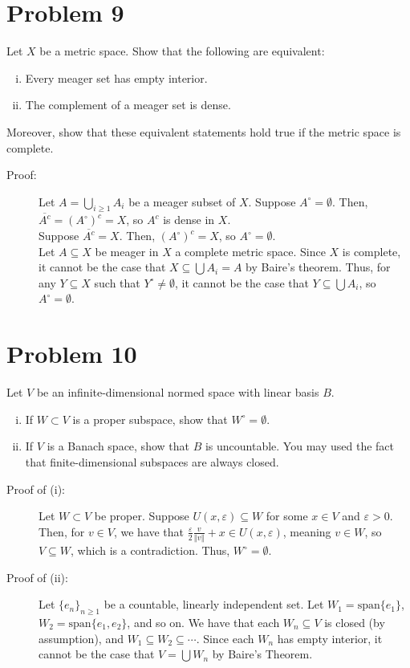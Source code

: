 \documentclass[10pt]{extarticle}
\newcommand{\norm}[1]{\left\Vert #1\right\Vert}
\begin{document}
  \section{Problem 9}%
  Let $X$ be a metric space. Show that the following are equivalent:
  \begin{enumerate}[(i)]
    \item Every meager set has empty interior.
    \item The complement of a meager set is dense.
  \end{enumerate}
  Moreover, show that these equivalent statements hold true if the metric space is complete.
  \begin{description}
    \item[Proof:] Let $A = \bigcup_{i\geq 1}A_i$ be a meager subset of $X$. Suppose $A^{\circ} = \emptyset$. Then, $\overline{A^{c}} = \left(A^{\circ}\right)^{c} = X$, so $A^{c}$ is dense in $X$.\\

      Suppose $\overline{A^{c}} = X$. Then, $\left(A^{\circ}\right)^{c} = X$, so $A^{\circ} = \emptyset$.\\

      Let $A\subseteq X$ be meager in $X$ a complete metric space. Since $X$ is complete, it cannot be the case that $X\subseteq \bigcup A_i = A$ by Baire's theorem. Thus, for any $Y\subseteq X$ such that $Y^{\circ}\neq \emptyset$, it cannot be the case that $Y\subseteq \bigcup A_i$, so $A^{\circ} = \emptyset$.
  \end{description}
  \section{Problem 10}%
  Let $V$ be an infinite-dimensional normed space with linear basis $B$.
  \begin{enumerate}[(i)]
    \item If $W\subset V$ is a proper subspace, show that $W^{\circ} = \emptyset$.
    \item If $V$ is a Banach space, show that $B$ is uncountable. You may used the fact that finite-dimensional subspaces are always closed.
  \end{enumerate}
  \begin{description}
    \item[Proof of (i):] Let $W\subset V$ be proper. Suppose $U(x,\varepsilon) \subseteq W$ for some $x\in V$ and $\varepsilon > 0$. Then, for $v\in V$, we have that $\frac{\varepsilon}{2}\frac{v}{\norm{v}} + x \in U(x,\varepsilon)$, meaning $v \in W$, so $V\subseteq W$, which is a contradiction. Thus, $W^{\circ} = \emptyset$.
    \item[Proof of (ii):] Let $\{e_n\}_{n\geq 1}$ be a countable, linearly independent set. Let $W_1 = \text{span}\{e_1\}$, $W_2 = \text{span}\{e_1,e_2\}$, and so on. We have that each $W_n\subseteq V$ is closed (by assumption), and $W_1\subseteq W_2\subseteq \cdots $. Since each $W_n$ has empty interior, it cannot be the case that $V = \bigcup W_n$ by Baire's Theorem.
  \end{description}
\end{document}
